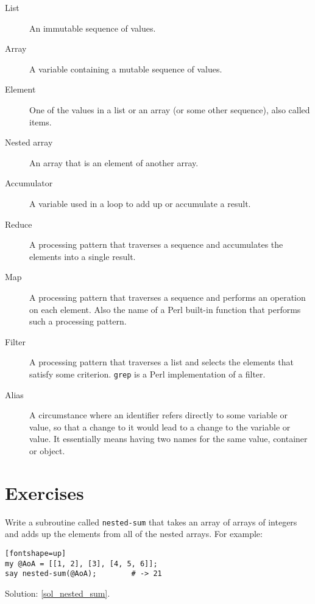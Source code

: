 \begin{description}

\item[List] An immutable sequence of values.

\item[Array] A variable containing a mutable sequence 
of values.

\item[Element] One of the values in a list or an 
array (or some other sequence), also called items.

\item[Nested array] An array that is an element of another array.

\item[Accumulator] A variable used in a loop to add up or
accumulate a result.

\item[Reduce] A processing pattern that traverses a sequence 
and accumulates the elements into a single result.

\item[Map] A processing pattern that traverses a 
sequence and performs an operation on each element. 
Also the name of a Perl built-in function that performs 
such a processing pattern.

\item[Filter] A processing pattern that traverses a 
list and selects the elements that satisfy some criterion. 
{\tt grep} is a Perl implementation of a filter.

\item[Alias] A circumstance where an identifier refers 
directly to some variable or value, so that 
a change to it would lead to a change to 
the variable or value. It essentially means having 
two names for the same value, container or object.

\end{description}


\section{Exercises}
\label{array_exercises}

\begin{exercise}

Write a subroutine called \verb"nested-sum" that takes an 
array of arrays of integers and adds up the elements from all of the nested arrays. For example:
\label{nested_sum}

\begin{verbatim}[fontshape=up]
my @AoA = [[1, 2], [3], [4, 5, 6]];
say nested-sum(@AoA);        # -> 21
\end{verbatim}

Solution: \ref{sol_nested_sum}.

\end{exercise}

